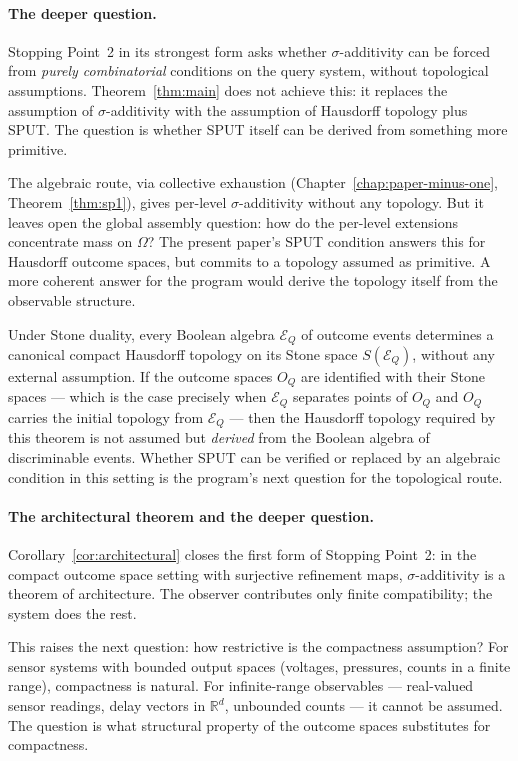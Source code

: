 \paragraph{The deeper question.}
Stopping Point~2 in its strongest form asks whether $\sigma$-additivity
can be forced from \emph{purely combinatorial} conditions on the
query system, without topological assumptions.  Theorem~\ref{thm:main}
does not achieve this: it replaces the assumption of
$\sigma$-additivity with the assumption of Hausdorff topology plus
SPUT.  The question is whether SPUT itself can be derived from
something more primitive.

The algebraic route, via collective exhaustion
(Chapter~\ref{chap:paper-minus-one}, Theorem~\ref{thm:sp1}), gives
per-level $\sigma$-additivity without any topology.  But it leaves
open the global assembly question: how do the per-level extensions
concentrate mass on $\Omega$?  The present paper's SPUT condition
answers this for Hausdorff outcome spaces, but commits to a topology
assumed as primitive.  A more coherent answer for the program would
derive the topology itself from the observable structure.

Under Stone duality, every Boolean algebra $\mathcal{E}_Q$ of
outcome events determines a canonical compact Hausdorff topology on
its Stone space $S(\mathcal{E}_Q)$, without any external assumption.
If the outcome spaces $O_Q$ are identified with their Stone spaces ---
which is the case precisely when $\mathcal{E}_Q$ separates points of
$O_Q$ and $O_Q$ carries the initial topology from $\mathcal{E}_Q$ ---
then the Hausdorff topology required by this theorem is not assumed
but \emph{derived} from the Boolean algebra of discriminable events.
Whether SPUT can be verified or replaced by an algebraic condition
in this setting is the program's next question for the topological
route.

\paragraph{The architectural theorem and the deeper question.}
Corollary~\ref{cor:architectural} closes the first form of
Stopping Point~2: in the compact outcome space setting with
surjective refinement maps, $\sigma$-additivity is a theorem of
architecture.  The observer contributes only finite compatibility;
the system does the rest.

This raises the next question: how restrictive is the compactness
assumption?  For sensor systems with bounded output spaces (voltages,
pressures, counts in a finite range), compactness is natural.  For
infinite-range observables --- real-valued sensor readings, delay
vectors in $\mathbb{R}^d$, unbounded counts --- it cannot be assumed.
The question is what structural property of the outcome spaces
substitutes for compactness.

